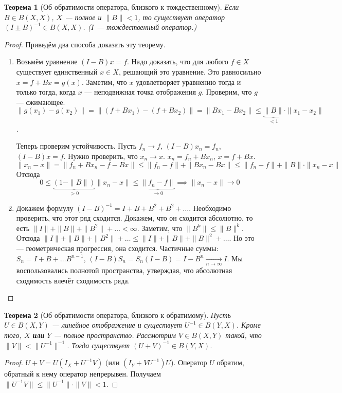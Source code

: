 \documentclass[11pt,openany,a4paper]{scrartcl}
\theoremstyle{plain}
\newtheorem{theorem}{Теорема}[section]
\theoremstyle{definition}
\newcommand{\underto}[1]{\xrightarrow[#1]{}}
\begin{document}
\begin{theorem}[Об обратимости оператора, близкого к тождественному]
    Если $B \in B(X, X)$, $X$ — полное и  $\|B\| < 1$, то существует оператор
    $(I \pm B)^{-1} \in B(X, X)$. ($I$ — тождественный оператор.)
\end{theorem}
\begin{proof}
    Приведём два способа доказать эту теорему.
    \begin{enumerate}
        \item Возьмём уравнение $(I-B)x = f$. Надо доказать, что для любого
        $f \in X$ существует единственный $x \in X$, решающий это уравнение.
        Это равносильно $x = f + Bx = g(x)$. Заметим, что $x$ удовлетворяет
        уравнению тогда и только тогда, когда $x$ — неподвижная точка отображения
        $g$. Проверим, что $g$ — сжимающее.
        $\|g(x_1) - g(x_2)\| = \|(f + Bx_1) - (f + Bx_2)\| =
        \|Bx_1 - Bx_2\| \leqslant \underbrace{\|B\|}_{< 1} \cdot \|x_1 - x_2\|$.
        
        Теперь проверим устойчивость. Пусть $f_n \to f$, $(I-B)x_n = f_n$,
        $(I-B)x=f$. Нужно проверить, что $x_n \to x$. $x_n = f_n + Bx_n$,
        $x = f + Bx$.
        $$
        \|x_n - x\| = \|f_n + Bx_n - f - Bx\| \leqslant \|f_n - f\| +
        \|Bx_n - Bx\| \leqslant \|f_n - f\| + \|B\|\cdot \|x_n - x\|
        $$
        Отсюда
        $$
        0 \leqslant \underbrace{(1 - \|B\|)}_{>0}\|x_n - x\|\leqslant
        \underbrace{\|f_n - f\|}_{\to 0} \implies
        \|x_n - x\| \to 0
        $$
        \item Докажем формулу $(I - B)^{-1} = I + B + B^2 + B^2 + \ldots$.
        Необходимо проверить, что этот ряд сходится. Докажем, что он
        сходится абсолютно, то есть $\|I\| + \|B\| + \|B^2\| + \ldots < \infty$.
        Заметим, что $\|B^k\| \leqslant \|B\|^k$. Отсюда
        $\|I\| + \|B\| + \|B^2\| + \ldots \leqslant
        \|I\| + \|B\| + \|B\|^2 + \ldots$. Но это — геометрическая прогрессия,
        она сходится.
        Частичные суммы: $S_n = I + B + \ldots B^{n-1}$,
        $(I - B)S_n = S_n(I-B) = I - B^n \underto{n \to \infty} I$.
        Мы воспользовались полнотой пространства, утверждая, что абсолютная
        сходимость влечёт сходимость ряда.
    \end{enumerate}
\end{proof}

\begin{theorem}[Об обратимости оператора, близкого к обратимому]
    Пусть $U \in B(X, Y)$ — линейное отображение и существует $U^{-1}\in B(Y, X)$.
    Кроме того, $X$ \textbf{или} $Y$ — полное пространство.
    Рассмотрим $V\in B(X, Y)$ такой, что $\|V\| < \|U^{-1}\|^{-1}$. Тогда
    существует $(U + V)^{-1} \in B(Y, X)$.
\end{theorem}
\begin{proof}
    $U + V = U(I_X + U^{-1}V)$ (или $(I_Y + VU^{-1})U$).
    Оператор $U$ обратим, обратный к нему оператор
    непрерывен. Получаем $\|U^{-1}V\|\leqslant\|U^{-1}\|\cdot\|V\| < 1$.
\end{proof}
\end{document}
